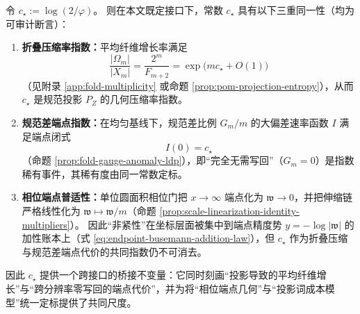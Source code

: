 \begin{proposition}[结论 C：熵隙常数 \texorpdfstring{$c_\star=\log(2/\varphi)$}{c*=log(2/phi)} 的三重同一性与端点普适指数]\label{prop:unit-circle-phase-entropy-gap-constant}
令
\(
c_\star:=\log(2/\varphi)
\)。
则在本文既定接口下，常数 \(c_\star\) 具有以下三重同一性（均为可审计断言）：
\begin{enumerate}
  \item \textbf{折叠压缩率指数：}平均纤维增长率满足
  \[
  \frac{|\Omega_m|}{|X_m|}=\frac{2^m}{F_{m+2}}=\exp\!\bigl(m c_\star+O(1)\bigr)
  \]
  （见附录 \ref{app:fold-multiplicity} 或命题 \ref{prop:pom-projection-entropy}），从而 \(c_\star\) 是规范投影 \(P_Z\) 的几何压缩率指数。

  \item \textbf{规范差端点指数：}在均匀基线下，规范差比例 \(G_m/m\) 的大偏差速率函数 \(I\) 满足端点闭式
  \[
  I(0)=c_\star
  \]
  （命题 \ref{prop:fold-gauge-anomaly-ldp}），即“完全无需写回”（\(G_m=0\)）是指数稀有事件，其稀有度由同一常数定标。

  \item \textbf{相位端点普适性：}单位圆面积相位门把 \(x\to\infty\) 端点化为 \(\mathfrak{w}\to 0\)，并把伸缩链严格线性化为 \(\mathfrak{w}\mapsto \mathfrak{w}/m\)（命题 \ref{prop:scale-linearization-identity-multipliers}）。
  因此“非紧性”在坐标层面被集中到端点精度势 \(y=-\log|\mathfrak{w}|\) 的加性账本上（式 \eqref{eq:endpoint-busemann-addition-law}），但 \(c_\star\) 作为折叠压缩与规范差端点代价的共同指数仍不可消去。
\end{enumerate}
因此 \(c_\star\) 提供一个跨接口的桥接不变量：它同时刻画“投影导致的平均纤维增长”与“跨分辨率零写回的端点代价”，并为将“相位端点几何”与“投影词成本模型”统一定标提供了共同尺度。
\end{proposition}
